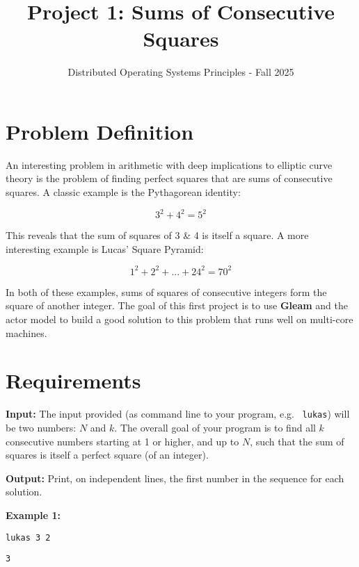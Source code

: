 \documentclass{article}
\title{Project 1: Sums of Consecutive Squares}
\date{Distributed Operating Systems Principles - Fall 2025}
\begin{document}
\maketitle

\section{Problem Definition}
An interesting problem in arithmetic with deep implications to elliptic curve
theory is the problem of finding perfect squares that are sums of consecutive
squares. 
A classic example is the Pythagorean identity:

\begin{equation}
    3^2 + 4^2 = 5^2
\end{equation}

This reveals that the sum of squares of 3 \& 4 is itself a square. A more interesting example is Lucas' Square Pyramid:

\begin{equation}
    1^2 + 2^2 + ... + 24^2 = 70^2
\end{equation}

In both of these examples, sums of squares of consecutive integers form the
square of another integer.
The goal of this first project is to use \textbf{Gleam} and the actor model to build a
good solution to this problem that runs well on multi-core machines.

\section{Requirements}
\textbf{Input:} The input provided (as command line to your program, e.g.  \texttt{lukas})
will be two numbers: $N$ and $k$. 
The overall goal of your program is to find all $k$ consecutive numbers starting at 1 or higher, and up to $N$, such that the sum of squares is itself a perfect square (of an integer).

\hspace{1cm}

\noindent\textbf{Output:} Print, on independent lines, the first number in the sequence for each
solution.

\hspace{1cm}

\noindent\textbf{Example 1:}

\texttt{lukas 3 2}

\texttt{3}

\hspace{1cm}
\end{document}
